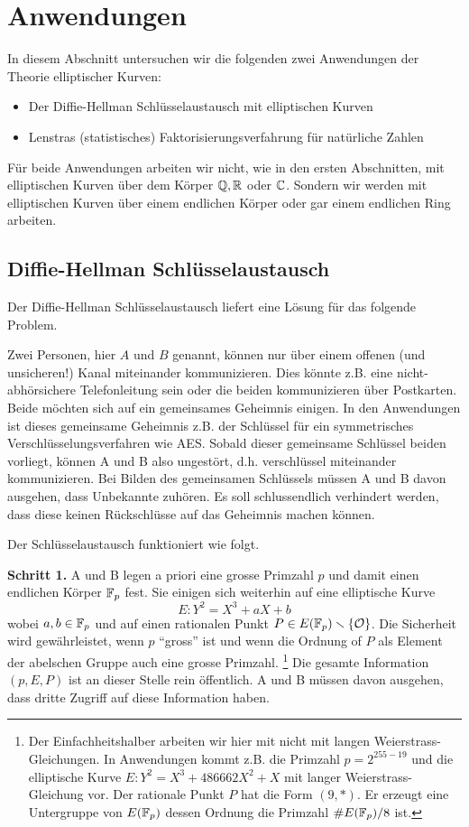 \chapter{Anwendungen}

In diesem Abschnitt untersuchen wir die folgenden
zwei Anwendungen der Theorie
elliptischer Kurven:

\begin{itemize}
\item Der Diffie-Hellman Schlüsselaustausch mit elliptischen Kurven
\item Lenstras (statistisches)
  Faktorisierungsverfahrung für natürliche Zahlen
\end{itemize}

Für beide Anwendungen arbeiten wir nicht, wie in den ersten
Abschnitten, mit elliptischen Kurven über dem Körper ${\mathbb{Q}},{\mathbb{R}}$ oder
${\mathbb{C}}$. Sondern wir werden mit elliptischen Kurven über einem endlichen
Körper oder gar einem endlichen Ring arbeiten. 

\section{Diffie-Hellman Schlüsselaustausch}

Der Diffie-Hellman Schlüsselaustausch liefert eine Lösung für das
folgende Problem.

Zwei Personen, hier $A$ und $B$ genannt, können nur über einem offenen
(und unsicheren!)
Kanal miteinander kommunizieren. Dies könnte z.B. eine
nicht-abhörsichere Telefonleitung sein oder die beiden kommunizieren
über Postkarten. Beide möchten sich auf ein gemeinsames Geheimnis
einigen. In den Anwendungen ist dieses gemeinsame Geheimnis z.B. der
Schlüssel für ein symmetrisches Verschlüsselungsverfahren wie 
AES. Sobald dieser gemeinsame Schlüssel beiden vorliegt, können A
und B also ungestört, d.h. verschlüssel miteinander kommunizieren. Bei
Bilden des gemeinsamen Schlüssels müssen A und B davon ausgehen, dass
Unbekannte zuhören. Es soll schlussendlich verhindert werden, dass
diese keinen Rückschlüsse auf das Geheimnis machen können.

Der Schlüsselaustausch funktioniert wie folgt.

\bigskip
\textbf{Schritt 1.} A und B legen a priori 
eine grosse Primzahl $p$ und damit einen endlichen Körper ${\mathbb{F}}_p$ fest.
Sie einigen sich weiterhin auf eine elliptische Kurve
$$E: Y^2 = X^3+aX+b$$
wobei $a,b\in{\mathbb{F}}_p$ und auf einen rationalen Punkt $P\in
E({\mathbb{F}}_p)\smallsetminus\{{\mathcal O}\}$. Die Sicherheit wird gewährleistet, wenn $p$
``gross'' ist und wenn die Ordnung of $P$ als Element der abelschen
Gruppe auch eine grosse  Primzahl.  
\footnote{Der Einfachheitshalber arbeiten wir hier
  mit nicht mit langen Weierstrass-Gleichungen. In Anwendungen kommt
  z.B. die Primzahl 
 $p = 2^{255-19}$ und die elliptische Kurve
  $E: Y^2 = X^3+486662X^2+X$ mit langer Weierstrass-Gleichung vor. Der
rationale Punkt $P$ hat die Form $(9,*)$. Er erzeugt eine Untergruppe
von $E({\mathbb{F}}_p)$ dessen Ordnung die Primzahl $\#E({\mathbb{F}}_p)/8$ ist.}
Die gesamte Information $(p,E,P)$ ist an dieser Stelle rein
öffentlich. A und B müssen davon ausgehen, dass dritte Zugriff auf
diese Information haben.

